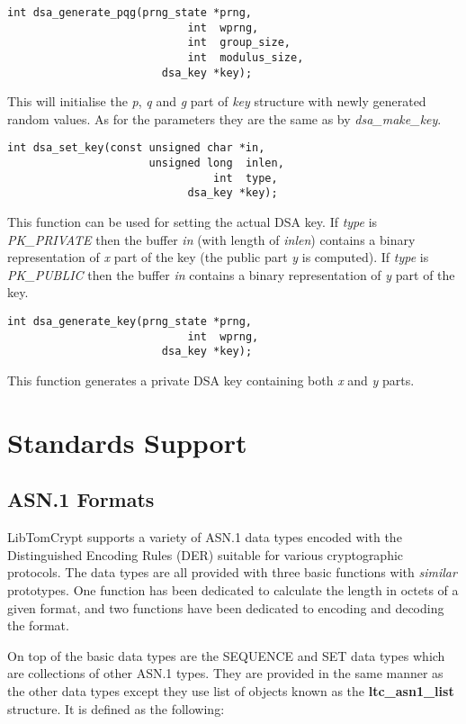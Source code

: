 \documentclass[synpaper]{book}
\newcommand{\mysection}[1]    %
	{                   %
	\section{#1}
   \markboth{\textsf{www.libtom.net}}{\thesection ~ {#1}}
	}
\begin{document}
\begin{verbatim}
int dsa_generate_pqg(prng_state *prng,
                            int  wprng,
                            int  group_size,
                            int  modulus_size,
                        dsa_key *key);
\end{verbatim}

This will initialise the \textit{p}, \textit{q} and \textit{g} part of \textit{key} structure with newly generated random values.
As for the parameters they are the same as by \textit{dsa\_make\_key}.

\begin{verbatim}
int dsa_set_key(const unsigned char *in,
                      unsigned long  inlen,
                                int  type,
                            dsa_key *key);
\end{verbatim}

This function can be used for setting the actual DSA key. If \textit{type} is \textit{PK\_PRIVATE} then the buffer \textit{in}
(with length of \textit{inlen}) contains a binary representation of \textit{x} part of the key (the public part \textit{y} is computed).
If \textit{type} is \textit{PK\_PUBLIC} then the buffer \textit{in} contains a binary representation of \textit{y} part of the key.

\begin{verbatim}
int dsa_generate_key(prng_state *prng,
                            int  wprng,
                        dsa_key *key);
\end{verbatim}

This function generates a private DSA key containing both \textit{x} and \textit{y} parts.

\chapter{Standards Support}
\mysection{ASN.1 Formats}
LibTomCrypt supports a variety of ASN.1 data types encoded with the Distinguished Encoding Rules (DER) suitable for various cryptographic protocols.  The data types
are all provided with three basic functions with \textit{similar} prototypes.  One function has been dedicated to calculate the length in octets of a given
format, and two functions have been dedicated to encoding and decoding the format.

On top of the basic data types are the SEQUENCE and SET data types which are collections of other ASN.1 types.  They are provided
in the same manner as the other data types except they use list of objects known as the \textbf{ltc\_asn1\_list} structure.  It is defined as the following:
\end{document}
